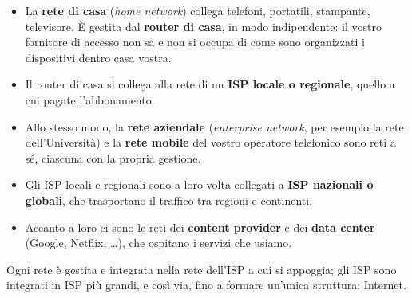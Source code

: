 \begin{itemize}
    \item La \textbf{rete di casa} (\emph{home network}) collega telefoni, portatili, stampante,
          televisore. È gestita dal \textbf{router di casa}, in modo indipendente: il vostro
          fornitore di accesso non sa e non si occupa di come sono organizzati i dispositivi dentro
          casa vostra.
    \item Il router di casa si collega alla rete di un \textbf{ISP locale o regionale}, quello a cui
          pagate l'abbonamento.
    \item Allo stesso modo, la \textbf{rete aziendale} (\emph{enterprise network}, per esempio la
          rete dell'Università) e la \textbf{rete mobile} del vostro operatore telefonico sono reti
          a sé, ciascuna con la propria gestione.
    \item Gli ISP locali e regionali sono a loro volta collegati a \textbf{ISP nazionali o globali},
          che trasportano il traffico tra regioni e continenti.
    \item Accanto a loro ci sono le reti dei \textbf{content provider} e dei \textbf{data center}
          (Google, Netflix, \dots), che ospitano i servizi che usiamo.
\end{itemize}

Ogni rete è gestita e integrata nella rete dell'ISP a cui si appoggia; gli ISP sono integrati
in ISP più grandi, e così via, fino a formare un'unica struttura: Internet.


